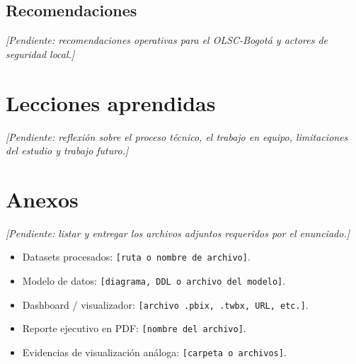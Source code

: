 \documentclass[12pt,letterpaper]{article}
\begin{document}
\subsection{Recomendaciones}

\textit{[Pendiente: recomendaciones operativas para el OLSC-Bogotá y actores de seguridad local.]}

\section{Lecciones aprendidas}

\textit{[Pendiente: reflexión sobre el proceso técnico, el trabajo en equipo, limitaciones del estudio y trabajo futuro.]}

\section{Anexos}

\textit{[Pendiente: listar y entregar los archivos adjuntos requeridos por el enunciado.]}
\begin{itemize}
    \item Datasets procesados: \texttt{[ruta o nombre de archivo]}.
    \item Modelo de datos: \texttt{[diagrama, DDL o archivo del modelo]}.
    \item Dashboard / visualizador: \texttt{[archivo .pbix, .twbx, URL, etc.]}.
    \item Reporte ejecutivo en PDF: \texttt{[nombre del archivo]}.
    \item Evidencias de visualización análoga: \texttt{[carpeta o archivos]}.
\end{itemize}
\end{document}
